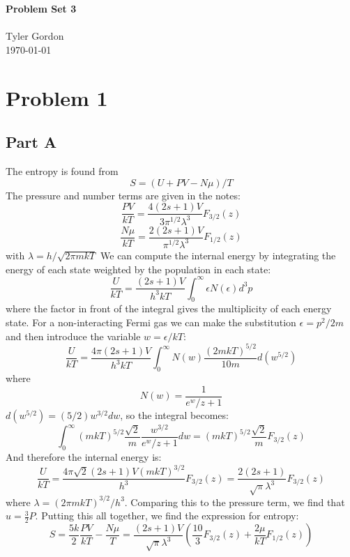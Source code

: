 \documentclass[a4paper, 11pt]{article}
\newcommand{\mytitle}{Problem Set 3}
\begin{document}
\noindent
\large\textbf{\mytitle} \\ \\ Tyler Gordon \\
\normalsize \today 
\ \ \hrulefill
\section*{Problem 1}
	\subsection*{Part A}
		The entropy is found from
		\begin{equation*}
			S = (U + PV - N\mu)/T
		\end{equation*}
		The pressure and number terms are given in the notes:
		\begin{equation*}
			\frac{PV}{kT} = \frac{4(2s+1)V}{3\pi^{1/2}\lambda^3}F_{3/2}(z)
		\end{equation*}
		\begin{equation*}
			\frac{N\mu}{kT} = \frac{2(2s+1)V}{\pi^{1/2}\lambda^3}F_{1/2}(z)
		\end{equation*}
		with $\lambda=h/\sqrt{2\pi mkT}$
		We can compute the internal energy by integrating the energy of each state 
		weighted by the population in each state:
		\begin{equation*}
			\frac{U}{kT} = \frac{(2s+1)V}{h^3kT}\int_0^\infty \epsilon N(\epsilon) d^3p
		\end{equation*}
		where the factor in front of the integral gives the multiplicity of each energy state. 
		For a non-interacting Fermi gas we can make the substitution $\epsilon=p^2/2m$ and 
		then introduce the variable $w=\epsilon/kT$:
		\begin{equation*}
			\frac{U}{kT} = \frac{4\pi(2s+1)V}{h^3kT}\int_0^\infty N(w) \frac{(2mkT)^{5/2}}{10m}d(w^{5/2})
		\end{equation*}
		where
		\begin{equation*}
			N(w) = \frac{1}{e^w/z + 1}
		\end{equation*}
		$d(w^{5/2}) = (5/2)w^{3/2}dw$, so the integral becomes:
		\begin{equation*}
			\int_0^\infty (mkT)^{5/2}\frac{\sqrt{2}}{m}\frac{w^{3/2}}{e^w/z+1}dw =(mkT)^{5/2}\frac{\sqrt{2}}{m}F_{3/2}(z)
		\end{equation*}
		And therefore the internal energy is:
		\begin{equation*}
			\frac{U}{kT} = \frac{4\pi\sqrt{2}(2s+1)V(mkT)^{3/2}}{h^3}F_{3/2}(z) = \frac{2(2s+1)}{\sqrt{\pi}\lambda^3}F_{3/2}(z)
		\end{equation*}
		where $\lambda = (2\pi mkT)^{3/2}/h^3$. Comparing this to the pressure term, we find that 
		$u = \frac{3}{2}P$. Putting this all together, we find the expression for entropy:
		\begin{equation*}
			S = \frac{5k}{2}\frac{PV}{kT} - \frac{N\mu}{T} = \frac{(2s+1)V}{\sqrt{\pi}\lambda^3}\left(\frac{10}{3}F_{3/2}(z) + \frac{2\mu}{kT}F_{1/2}(z)\right)
		\end{equation*}
\end{document}
